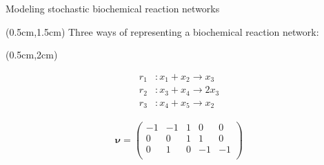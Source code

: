 \documentclass[aspectratio=1610]{beamer}					%
\begin{document}
\begin{frame}{Modeling stochastic biochemical reaction networks}

\begin{textblock*}{15cm}(0.5cm,1.5cm)
Three ways of representing a biochemical reaction network:
\end{textblock*}

\begin{textblock*}{15cm}(0.5cm,2cm)
\begin{center}
\noindent\begin{minipage}{.3\linewidth}
\begin{center}
\begin{align*}
r_{1}&: x_{1} + x_{2} \rightarrow x_{3}\\
r_{2}&: x_{3} + x_{4} \rightarrow 2x_{3}\\
r_{3}&: x_{4} + x_{5} \rightarrow x_{2}
\end{align*}
\end{center}
\end{minipage}%
\begin{minipage}{.3\linewidth}
\begin{center}
\begin{align*}
\mathbf{\nu} = \begin{pmatrix}
-1 & -1 & 1 & 0 & 0\\
0 & 0 & 1 & 1 & 0\\
0 & 1 & 0 & -1 & -1\\
\end{pmatrix}
\end{align*}
\end{center}
\end{minipage}
\begin{minipage}{.3\linewidth}
\begin{center}
\end{center}
\end{minipage}
\end{center}
\end{textblock*}

\end{frame}
\end{document}
